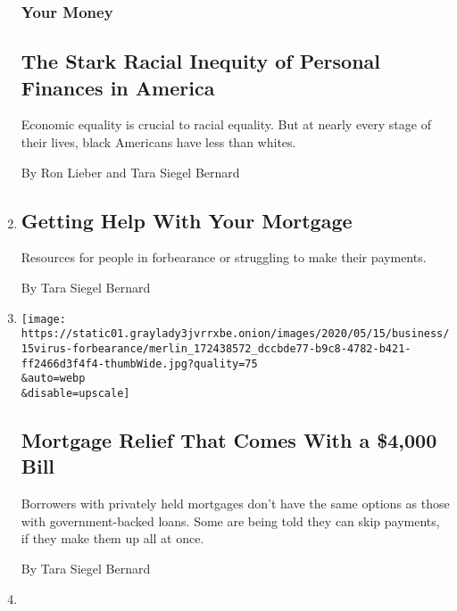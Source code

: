 \begin{enumerate}
  \hypertarget{your-money}{%
  \subsubsection{Your Money}\label{your-money}}

  \hypertarget{the-stark-racial-inequity-of-personal-finances-in-america}{%
  \subsection{The Stark Racial Inequity of Personal Finances in
  America}\label{the-stark-racial-inequity-of-personal-finances-in-america}}

  Economic equality is crucial to racial equality. But at nearly every
  stage of their lives, black Americans have less than whites.

  By Ron Lieber and Tara Siegel Bernard
\item
  \href{/2020/05/15/business/covid-mortgage-forbearance.html}{}

  \hypertarget{getting-help-with-your-mortgage}{%
  \subsection{Getting Help With Your
  Mortgage}\label{getting-help-with-your-mortgage}}

  Resources for people in forbearance or struggling to make their
  payments.

  By Tara Siegel Bernard
\item
  \href{/2020/05/15/business/coronavirus-mortgage-relief.html}{}

  \texttt{[image: https://static01.graylady3jvrrxbe.onion/images/2020/05/15/business/15virus-forbearance/merlin\_172438572\_dccbde77-b9c8-4782-b421-ff2466d3f4f4-thumbWide.jpg?quality=75\\\&auto=webp\\\&disable=upscale]}

  \hypertarget{mortgage-relief-that-comes-with-a-4000-bill}{%
  \subsection{Mortgage Relief That Comes With a \$4,000
  Bill}\label{mortgage-relief-that-comes-with-a-4000-bill}}

  Borrowers with privately held mortgages don't have the same options as
  those with government-backed loans. Some are being told they can skip
  payments, if they make them up all at once.

  By Tara Siegel Bernard
\item
  \href{/2020/05/01/your-money/food-stamps-snap-coronavirus.html}{}


\end{enumerate}
